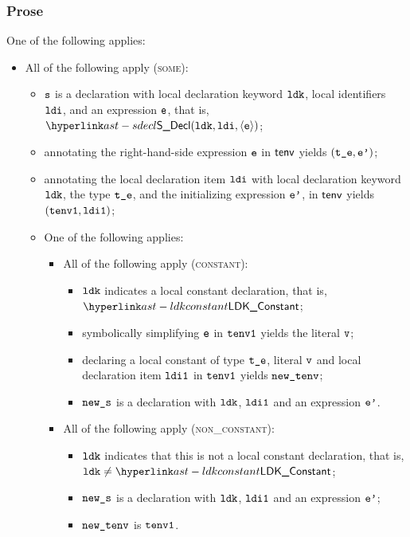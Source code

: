 \subsubsection{Prose}
One of the following applies:
\begin{itemize}
  \item All of the following apply (\textsc{some}):
  \begin{itemize}
    \item $\texttt{s}$ is a declaration with local declaration keyword $\texttt{ldk}$, local identifiers $\texttt{ldi}$, and an expression $\texttt{e}$,
          that is, $\SDecl(\ldk, \ldi, \langle\ve\rangle)$;
    \item annotating the right-hand-side expression $\texttt{e}$ in $\textsf{tenv}$ yields $(\texttt{t\_e},\texttt{e'})$\ProseOrTypeError;
    \item annotating the local declaration item $\texttt{ldi}$ with local declaration keyword $\texttt{ldk}$, the type $\texttt{t\_e}$,
          and the initializing expression $\texttt{e'}$, in $\textsf{tenv}$
          yields $(\texttt{tenv1}, \texttt{ldi1})$;
    \item One of the following applies:
    \begin{itemize}
      \item All of the following apply (\textsc{constant}):
      \begin{itemize}
        \item $\texttt{ldk}$ indicates a local constant declaration, that is, $\LDKConstant$;
        \item symbolically simplifying $\texttt{e}$ in $\texttt{tenv1}$ yields the literal $\texttt{v}$\ProseOrTypeError;
        \item declaring a local constant of type $\texttt{t\_e}$, literal $\texttt{v}$ and local declaration item $\texttt{ldi1}$ in $\texttt{tenv1}$ yields $\texttt{new\_tenv}$;
        \item $\texttt{new\_s}$ is a declaration with $\texttt{ldk}$, $\texttt{ldi1}$ and an expression $\texttt{e'}$.
      \end{itemize}

      \item All of the following apply (\textsc{non\_constant}):
      \begin{itemize}
        \item $\texttt{ldk}$ indicates that this is not a local constant declaration, that is, $\ldk\neq\LDKConstant$;
        \item $\texttt{new\_s}$ is a declaration with $\texttt{ldk}$, $\texttt{ldi1}$ and an expression $\texttt{e'}$;
        \item $\texttt{new\_tenv}$ is $\texttt{tenv1}$.
      \end{itemize}
    \end{itemize}
  \end{itemize}


\end{itemize}
